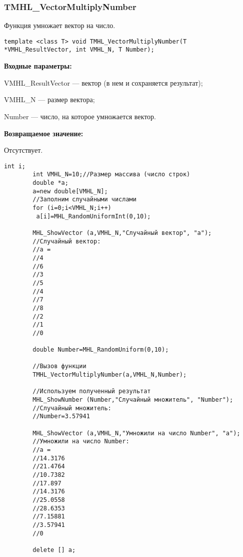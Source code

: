 \documentclass[a4paper,12pt]{article}
\begin{document}
\subsubsection{TMHL\_VectorMultiplyNumber}\label{TMHL_VectorMultiplyNumber}

Функция умножает вектор на число.


\begin{lstlisting}[label=code_syntax_TMHL_VectorMultiplyNumber,caption=Синтаксис]
template <class T> void TMHL_VectorMultiplyNumber(T *VMHL_ResultVector, int VMHL_N, T Number);
\end{lstlisting}

\textbf{Входные параметры:}

 VMHL\_ResultVector --- вектор (в нем и сохраняется результат);
 
 VMHL\_N --- размер вектора;
 
 Number --- число, на которое умножается вектор.

\textbf{Возвращаемое значение:}

Отсутствует.


\begin{lstlisting}[label=code_use_TMHL_VectorMultiplyNumber,caption=Пример использования]
        int i;
        int VMHL_N=10;//Размер массива (число строк)
        double *a;
        a=new double[VMHL_N];
        //Заполним случайными числами
        for (i=0;i<VMHL_N;i++)
         a[i]=MHL_RandomUniformInt(0,10);

        MHL_ShowVector (a,VMHL_N,"Случайный вектор", "a");
        //Случайный вектор:
        //a =
        //4
        //6
        //3
        //5
        //4
        //7
        //8
        //2
        //1
        //0

        double Number=MHL_RandomUniform(0,10);

        //Вызов функции
        TMHL_VectorMultiplyNumber(a,VMHL_N,Number);

        //Используем полученный результат
        MHL_ShowNumber (Number,"Случайный множитель", "Number");
        //Случайный множитель:
        //Number=3.57941

        MHL_ShowVector (a,VMHL_N,"Умножили на число Number", "a");
        //Умножили на число Number:
        //a =
        //14.3176
        //21.4764
        //10.7382
        //17.897
        //14.3176
        //25.0558
        //28.6353
        //7.15881
        //3.57941
        //0

        delete [] a;
\end{lstlisting}
\end{document}
